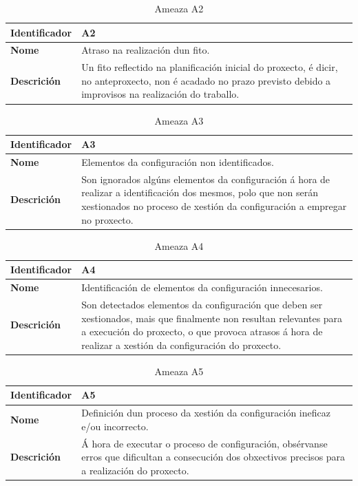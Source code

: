 \begin{table}[H]
\caption{Ameaza A2}
\label{A2}
\begin{tabularx}{\textwidth}{|l|X|}
\hline
\textbf{Identificador} & A2 \\ \hline
\textbf{Nome} & Atraso na realización dun fito. \\ \hline
\textbf{Descrición} & Un fito reflectido na planificación inicial do proxecto, é dicir, no anteproxecto, non é acadado no prazo previsto debido a improvisos na realización do traballo. \\ \hline
\end{tabularx}
\end{table}

\begin{table}[H]
\caption{Ameaza A3}
\label{A3}
\begin{tabularx}{\textwidth}{|l|X|}
\hline
\textbf{Identificador} & A3 \\ \hline
\textbf{Nome} & Elementos da configuración non identificados. \\ \hline
\textbf{Descrición} & Son ignorados algúns elementos da configuración á hora de realizar a identificación dos mesmos, polo que non serán xestionados no proceso de xestión da configuración a empregar no proxecto. \\ \hline
\end{tabularx}
\end{table}

\begin{table}[H]
\caption{Ameaza A4}
\label{A4}
\begin{tabularx}{\textwidth}{|l|X|}
\hline
\textbf{Identificador} & A4 \\ \hline
\textbf{Nome} & Identificación de elementos da configuración innecesarios. \\ \hline
\textbf{Descrición} & Son detectados elementos da configuración que deben ser xestionados, mais que finalmente non resultan relevantes para a execución do proxecto, o que provoca atrasos á hora de realizar a xestión da configuración do proxecto. \\ \hline
\end{tabularx}
\end{table}

\begin{table}[H]
\caption{Ameaza A5}
\label{A5}
\begin{tabularx}{\textwidth}{|l|X|}
\hline
\textbf{Identificador} & A5 \\ \hline
\textbf{Nome} & Definición dun proceso da xestión da configuración ineficaz e/ou incorrecto. \\ \hline
\textbf{Descrición} & Á hora de executar o proceso de configuración, obsérvanse erros que dificultan a consecución dos obxectivos precisos para a realización do proxecto. \\ \hline
\end{tabularx}
\end{table}

